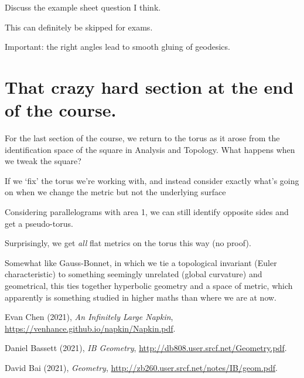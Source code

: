 \documentclass[11pt]{scrartcl}
\begin{document}
\begin{example}

Discuss the example sheet question I think.

This can definitely be skipped for exams.
\end{example}

\begin{proposition}

Important: the right angles lead to smooth gluing of geodesics.
\end{proposition}

\section{That crazy hard section at the end of the course.}

For the last section of the course, we return to the torus as it arose from the identification space of the square in Analysis and Topology. What happens when we tweak the square?

If we `fix' the torus we're working with, and instead consider exactly what's going on when we change the metric but not the underlying surface

Considering parallelograms with area 1, we can still identify opposite sides and get a pseudo-torus.

Surprisingly, we get \textit{all} flat metrics on the torus this way (no proof).

Somewhat like Gauss-Bonnet, in which we tie a topological invariant (Euler characteristic) to something seemingly unrelated (global curvature) and geometrical, this ties together hyperbolic geometry and a space of metric, which apparently is something studied in higher maths than where we are at now.

\begin{thebibliography}{9}
Evan Chen (2021), \emph{An Infinitely Large Napkin}, \url{https://venhance.github.io/napkin/Napkin.pdf}.

Daniel Bassett (2021), \emph{IB Geometry}, \url{http://db808.user.srcf.net/Geometry.pdf}.

David Bai (2021), \emph{Geometry}, \url{http://zb260.user.srcf.net/notes/IB/geom.pdf}.



\end{thebibliography}
\end{document}
